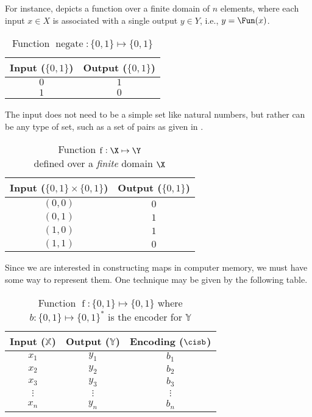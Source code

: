 \documentclass{article}
\begin{document}
For instance,  depicts a function over a finite domain of $n$ elements, where each input $x \in X$ is associated with a single output $y \in Y$, i.e., $y = \Fun(x)$.

\begin{table}
    \centering
    \caption{Function $\operatorname{negate} : \{0,1\} \mapsto \{0,1\}$}
    \label{tbl:tabfunc}
    \begin{tabular}{|c c|} 
        \hline
        Input ($\{0,1\}$) & Output ($\{0,1\}$)\\
        \hline
        $0$ & $1$\\
        $1$ & $0$\\    
        \hline
    \end{tabular}
\end{table}

The input does not need to be a simple set like natural numbers, but rather can be any type of set, such as a set of pairs as given in .

\begin{table}
\centering
\caption{Function $\operatorname{f} : \X \mapsto \Y$\\defined over a \emph{finite} domain $\X$}
\label{tbl:tabfunc2}
\begin{tabular}{|c c|} 
\hline
Input ($\{0,1\} \times \{0,1\}$) & Output ($\{0,1\}$)\\
\hline
    $(0,0)$ & $0$\\
    $(0,1)$ & $1$\\
    $(1,0)$ & $1$\\
    $(1,1)$ & $0$\\    
\hline
\end{tabular}
\end{table}


Since we are interested in constructing maps in computer memory, we must have some way to represent them.
One technique may be given by the following table.

\begin{table}
\centering
\caption{Function $\operatorname{f} : \{0,1\} \mapsto \{0,1\}$ where $b : \{0,1\} \mapsto \{0,1\}^*$ is the encoder for $\mathbb{Y}$}
\label{tbl:tabfunc}
\begin{tabular}{|c c c|} 
\hline
Input ($\mathbb{X}$) & Output ($\mathbb{Y}$) & Encoding ($\cisb$)\\
\hline
    $x_1$ & $y_1$ & $b_1$\\
    $x_2$ & $y_2$ & $b_2$\\
    $x_3$ & $y_3$ & $b_3$\\
    $\vdots$ & $\vdots$ & $\vdots$\\
    $x_n$ & $y_n$ & $b_n$\\
\hline
\end{tabular}
\end{table}
\end{document}
